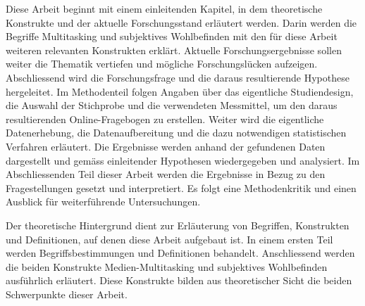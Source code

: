 \label{section.einleitung.aufbau}
Diese Arbeit beginnt mit einem einleitenden Kapitel, in dem theoretische Konstrukte und der aktuelle Forschungsstand erläutert werden. Darin werden die Begriffe Multitasking und subjektives Wohlbefinden mit den für diese Arbeit weiteren relevanten Konstrukten erklärt. Aktuelle Forschungsergebnisse sollen weiter die Thematik vertiefen und mögliche Forschungslücken aufzeigen. Abschliessend wird die Forschungsfrage und die daraus resultierende Hypothese hergeleitet. Im Methodenteil folgen Angaben über das eigentliche Studiendesign, die Auswahl der Stichprobe und die verwendeten Messmittel, um den daraus resultierenden Online-Fragebogen zu erstellen. Weiter wird die eigentliche Datenerhebung, die Datenaufbereitung und die dazu notwendigen statistischen Verfahren erläutert. Die Ergebnisse werden anhand der gefundenen Daten dargestellt und gemäss einleitender Hypothesen wiedergegeben und analysiert. Im Abschliessenden Teil dieser Arbeit werden die Ergebnisse in Bezug zu den Fragestellungen gesetzt und interpretiert. Es folgt eine Methodenkritik und einen Ausblick für weiterführende Untersuchungen.

\label{section.einleitung.theoHintegrund}
Der theoretische Hintergrund dient zur Erläuterung von Begriffen, Konstrukten und Definitionen, auf denen diese Arbeit aufgebaut ist. In einem ersten Teil werden Begriffsbestimmungen und Definitionen behandelt. Anschliessend werden die beiden Konstrukte Medien-Multitasking und subjektives Wohlbefinden ausführlich erläutert. Diese Konstrukte bilden aus theoretischer Sicht die beiden Schwerpunkte dieser Arbeit.

